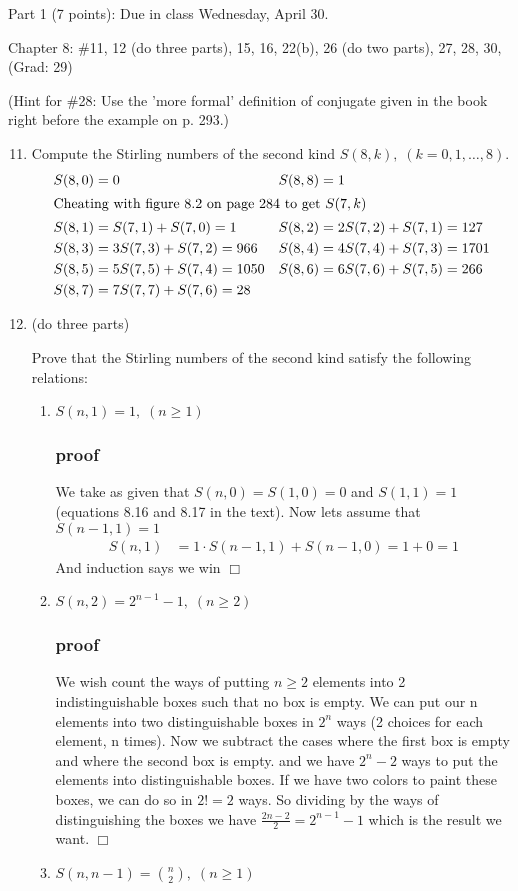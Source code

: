 \documentclass{article}
\begin{document}
Part 1 (7 points): Due in class Wednesday, April 30.

Chapter 8: \#11, 12 (do three parts), 15, 16, 22(b), 26 (do two parts), 27, 28, 30, (Grad: 29)

(Hint for \#28: Use the 'more formal' definition of conjugate given in the book right before the example on p. 293.)


\begin{enumerate}
  \setcounter{enumi}{10}
  \item
  Compute the Stirling numbers of the second kind $S(8,k),\;(k=0,1,\dots,8)$.
  \begin{align*}
    S(8,0)&=0&S(8,8)&=1\\
    \intertext{Cheating with figure 8.2 on page 284 to get $S(7,k)$}
    S(8,1)&=S(7,1)+S(7,0)=1&S(8,2)&=2S(7,2)+S(7,1)=127\\
    S(8,3)&=3S(7,3)+S(7,2)=966&S(8,4)&=4S(7,4)+S(7,3)=1701\\
    S(8,5)&=5S(7,5)+S(7,4)=1050&S(8,6)&=6S(7,6)+S(7,5)=266\\
    S(8,7)&=7S(7,7)+S(7,6)=28
  \end{align*}
  \item
  (do three parts)

  Prove that the Stirling numbers of the second kind satisfy the following relations:
  \begin{enumerate}
    \item
    $S(n,1)=1,\;(n\ge1)$
    \subsubsection*{proof}
    We take as given that $S(n,0)=S(1,0)=0$ and $S(1,1)=1$ (equations 8.16 and 8.17 in the text). Now lets assume that $S(n-1,1)=1$
    \begin{align*}
      S(n,1)&=1\cdot S(n-1,1)+S(n-1,0)=1+0=1
    \end{align*}
    And induction says we win $\Box$
    \item
    $S(n,2)=2^{n-1}-1,\;(n\ge2)$
    \subsubsection*{proof}
    We wish count the ways of putting $n\ge2$ elements into 2 indistinguishable boxes such that no box is empty. We can put our n elements into two distinguishable boxes in $2^n$ ways (2 choices for each element, n times). Now we subtract the cases where the first box is empty and where the second box is empty. and we have $2^n-2$ ways to put the elements into distinguishable boxes. If we have two colors to paint these boxes, we can do so in $2!=2$ ways. So dividing by the ways of distinguishing the boxes we have $\frac{2n-2}{2}=2^{n-1}-1$ which is the result we want. $\Box$
    \item
    $S(n,n-1)=\binom{n}{2},\;(n\ge1)$

\end{enumerate}
\end{enumerate}
\end{document}

